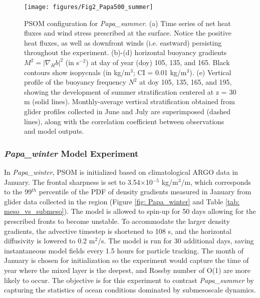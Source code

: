 \documentclass[draft,linenumbers]{agujournal2018}
\begin{document}
\begin{figure}[t]
	\texttt{[image: figures/Fig2\_Papa500\_summer]}
	\caption{PSOM configuration for \textit{Papa\_summer}. (a) Time series of net heat fluxes and wind stress prescribed at the surface. Notice the positive heat fluxes, as well as downfront winds (i.e. eastward) persisting throughout the experiment. (b)-(d) horizontal buoyancy gradients $M^2 = |\nabla_Hb|^2$ (in s$^{-2}$) at day of year (doy) 105, 135, and 165. Black contours show isopycnals (in kg/m$^3$; CI = 0.01 kg/m$^3$). (e) Vertical profile of the buoyancy frequency $N^2$ at doy 105, 135, 165, and 195, showing the development of summer stratification centered at z = 30 m (solid lines). Monthly-average vertical stratification obtained from glider profiles collected in June and July are superimposed (dashed lines), along with the correlation coefficient between observations and model outputs.}
	\label{fig: Papa_summer}
\end{figure} 


\subsubsection{\textit{Papa\_winter} Model Experiment}

In \textit{Papa\_winter}, PSOM is initialized based on climatological ARGO data in January. The frontal sharpness is set to 3.54$\times$10$^{-5}$ kg/m$^3$/m, which corresponds to the 99$^{th}$ percentile of the PDF of density gradients measured in January from glider data collected in the region (Figure \ref{fig: Papa_winter} and Table \ref{tab: meso_vs_submeso}). The model is allowed to spin-up for 50 days allowing for the prescribed fronts to become unstable. To accommodate the larger density gradients, the advective timestep is shortened to 108 s, and the horizontal diffusivity is lowered to 0.2 m$^2$/s. The model is run for 30 additional days, saving instantaneous model fields every 1.5 hours for particle tracking. The month of January is chosen for initialization so the experiment would capture the time of year where the mixed layer is the deepest, and Rossby number of O(1) are more likely to occur. The objective is for this experiment to contrast \textit{Papa\_summer} by capturing the statistics of ocean conditions dominated by submesoscale dynamics.
\end{document}
